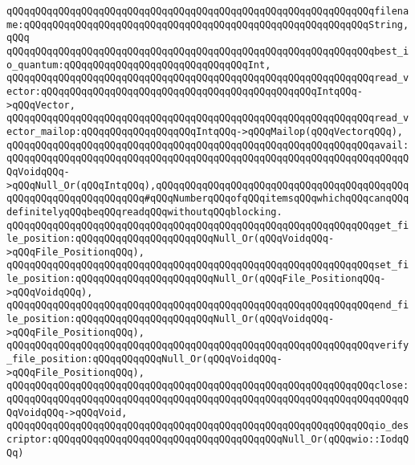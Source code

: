 \verb|qQQqqQQqqQQqqQQqqQQqqQQqqQQqqQQqqQQqqQQqqQQqqQQqqQQqqQQqqQQqqQQqfilename:qQQqqQQqqQQqqQQqqQQqqQQqqQQqqQQqqQQqqQQqqQQqqQQqqQQqqQQqqQQqString,qQQq|\newline
\verb|qQQqqQQqqQQqqQQqqQQqqQQqqQQqqQQqqQQqqQQqqQQqqQQqqQQqqQQqqQQqqQQqbest_io_quantum:qQQqqQQqqQQqqQQqqQQqqQQqqQQqqQQqInt,|\newline
\newline
\verb|qQQqqQQqqQQqqQQqqQQqqQQqqQQqqQQqqQQqqQQqqQQqqQQqqQQqqQQqqQQqqQQqread_vector:qQQqqQQqqQQqqQQqqQQqqQQqqQQqqQQqqQQqqQQqqQQqqQQqIntqQQq->qQQqVector,|\newline
\newline
\verb|qQQqqQQqqQQqqQQqqQQqqQQqqQQqqQQqqQQqqQQqqQQqqQQqqQQqqQQqqQQqqQQqread_vector_mailop:qQQqqQQqqQQqqQQqqQQqIntqQQq->qQQqMailop(qQQqVectorqQQq),|\newline
\newline
\verb|qQQqqQQqqQQqqQQqqQQqqQQqqQQqqQQqqQQqqQQqqQQqqQQqqQQqqQQqqQQqqQQqavail:qQQqqQQqqQQqqQQqqQQqqQQqqQQqqQQqqQQqqQQqqQQqqQQqqQQqqQQqqQQqqQQqqQQqqQQqVoidqQQq->qQQqNull_Or(qQQqIntqQQq),qQQqqQQqqQQqqQQqqQQqqQQqqQQqqQQqqQQqqQQqqQQqqQQqqQQqqQQqqQQqqQQqqQQq#qQQqNumberqQQqofqQQqitemsqQQqwhichqQQqcanqQQqdefinitelyqQQqbeqQQqreadqQQqwithoutqQQqblocking.|\newline
\newline
\verb|qQQqqQQqqQQqqQQqqQQqqQQqqQQqqQQqqQQqqQQqqQQqqQQqqQQqqQQqqQQqqQQqget_file_position:qQQqqQQqqQQqqQQqqQQqqQQqNull_Or(qQQqVoidqQQq->qQQqFile_PositionqQQq),|\newline
\verb|qQQqqQQqqQQqqQQqqQQqqQQqqQQqqQQqqQQqqQQqqQQqqQQqqQQqqQQqqQQqqQQqset_file_position:qQQqqQQqqQQqqQQqqQQqqQQqNull_Or(qQQqFile_PositionqQQq->qQQqVoidqQQq),|\newline
\newline
\verb|qQQqqQQqqQQqqQQqqQQqqQQqqQQqqQQqqQQqqQQqqQQqqQQqqQQqqQQqqQQqqQQqend_file_position:qQQqqQQqqQQqqQQqqQQqqQQqNull_Or(qQQqVoidqQQq->qQQqFile_PositionqQQq),|\newline
\verb|qQQqqQQqqQQqqQQqqQQqqQQqqQQqqQQqqQQqqQQqqQQqqQQqqQQqqQQqqQQqqQQqverify_file_position:qQQqqQQqqQQqNull_Or(qQQqVoidqQQq->qQQqFile_PositionqQQq),|\newline
\newline
\verb|qQQqqQQqqQQqqQQqqQQqqQQqqQQqqQQqqQQqqQQqqQQqqQQqqQQqqQQqqQQqqQQqclose:qQQqqQQqqQQqqQQqqQQqqQQqqQQqqQQqqQQqqQQqqQQqqQQqqQQqqQQqqQQqqQQqqQQqqQQqVoidqQQq->qQQqVoid,|\newline
\newline
\verb|qQQqqQQqqQQqqQQqqQQqqQQqqQQqqQQqqQQqqQQqqQQqqQQqqQQqqQQqqQQqqQQqio_descriptor:qQQqqQQqqQQqqQQqqQQqqQQqqQQqqQQqqQQqqQQqNull_Or(qQQqwio::IodqQQq)|\newline
